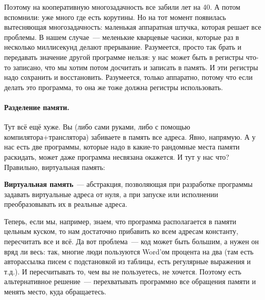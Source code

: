 \documentclass{article}
\begin{document}
    Поэтому на кооперативную многозадачность все забили лет на 40. А потом вспомнили: уже много где есть корутины. Но на тот момент появилась вытесняющая многозадачность: маленькая аппаратная штучка, которая решает все проблемы. В нашем случае~--- меленькие кварцевые часики, которые раз в несколько миллисекунд делают прерывание. Разумеется, просто так брать и передавать значение другой программе нельзя: у нас может быть в регистры что-то записано, что мы хотим потом досчитать и записать в память. И эти регистры надо сохранить и восстановить. Разумеется, только аппаратно, потому что если делать это программа, то она же тоже должна регистры использовать.

    \paragraph{Разделение памяти.}
    Тут всё ещё хуже. Вы (либо сами руками, либо с помощью компилятора+транслятора) забиваете в память все адреса. Явно, напрямую. А у нас есть две программы, которые надо в какие-то рандомные места памяти раскидать, может даже программа несвязана окажется. И тут у нас что? Правильно, виртуальная память:
    \begin{definition}
        \textbf{Виртуальная память}~--- абстракция, позволяющая при разработке программы задавать виртуальные адреса от нуля, а при запуске или исполнении преобразовывать их в реальные адреса.
    \end{definition}
    Теперь, если мы, например, знаем, что программа располагается в памяти цельным куском, то нам достаточно прибавить ко всем адресам константу, пересчитать все и всё. Да вот проблема~--- код может быть большим, а нужен он вряд ли весь: так, многие люди пользуются Word'ом процента на два (там есть авторассылка писем с подстановкой из таблицы, есть регулярные выражения и т.д.). И пересчитывать то, чем вы не пользуетесь, не хочется. Поэтому есть альтернативное решение~--- перехватывать программно все обращения памяти и менять место, куда обращаетесь.
\end{document}
